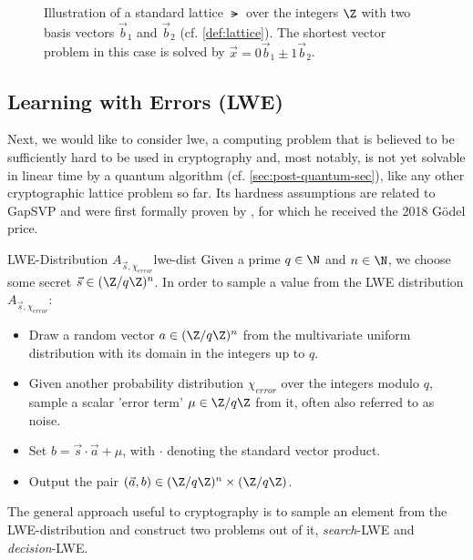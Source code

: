 \begin{figure}
  \centering
  \caption[Illustration of a standard lattice]{Illustration of a standard lattice $\lat$ over the integers $\Z$ with two basis vectors $\vec{b}_1$ and $\vec{b}_2$ (cf. \cref{def:lattice}).
    The shortest vector problem in this case is solved by $\vec{x} = 0 \vec{b}_1 \pm 1 \vec{b}_2$.}
  \label{fig:lattice}
\end{figure}

\subsection{Learning with Errors (LWE)}
\label{subsec:lwe}
Next, we would like to consider \gls{lwe}, a computing problem that is believed to be sufficiently hard to be used in cryptography and, most notably, is not yet solvable in linear time by a quantum algorithm (cf. \cref{sec:post-quantum-sec}), like any other cryptographic lattice problem so far.
Its hardness assumptions are related to GapSVP and were first formally proven by \citeauthor{2005-lwe-original}, for which he received the 2018 Gödel price.

\begin{definition}{LWE-Distribution $A_{\vec{s}, \chi_{error}}$}{lwe-dist}
  Given a prime $q \in \N$ and $n \in \N$, we choose some secret $\vec{s} \in (\Z / q \Z)^n$.
  In order to sample a value from the LWE distribution $A_{\vec{s}, \chi_{error}}$:
  \begin{itemize}
    \item Draw a random vector $a \in (\Z/q\Z)^n$ from the multivariate uniform distribution with its domain in the integers up to $q$.
    \item Given another probability distribution $\chi_{error}$ over the integers modulo $q$, sample a scalar 'error term' $\mu \in \Z / q \Z$ from it, often also referred to as noise.
    \item Set $b = \vec{s} \cdot \vec{a} + \mu$, with $\cdot$ denoting the standard vector product.
    \item Output the pair $(\vec{a}, b) \in (\Z / q \Z)^n \times (\Z / q \Z)$.
  \end{itemize}
\end{definition}

The general approach useful to cryptography is to sample an element from the LWE-distribution and construct two problems out of it, \textit{search}-LWE and \textit{decision}-LWE.

